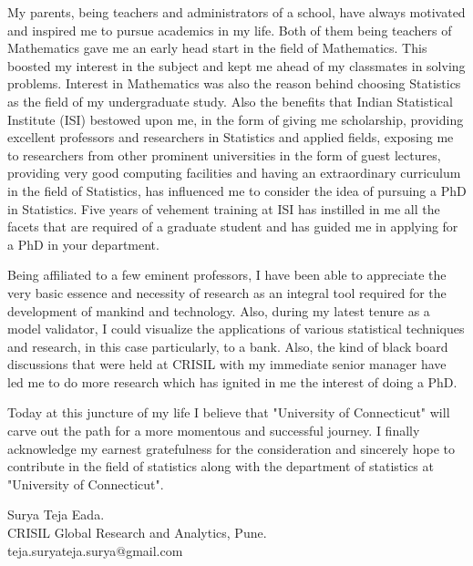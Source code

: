 \documentclass[10pt]{article}
\begin{document}
My parents, being teachers and administrators of a school, have always motivated and inspired me to pursue academics in my life. Both of them being teachers of Mathematics gave me an early head start in the field of Mathematics. This boosted my interest in the subject and kept me ahead of my classmates in solving problems. Interest in Mathematics was also the reason behind choosing Statistics as the field of my undergraduate study. Also the benefits that Indian Statistical Institute (ISI) bestowed upon me, in the form of giving me scholarship, providing excellent professors and researchers in Statistics and applied fields, exposing me to researchers from other prominent universities in the form of guest lectures, providing very good computing facilities and having an extraordinary curriculum in the field of Statistics, has influenced me to consider the idea of pursuing a PhD in Statistics.  Five years of vehement training at ISI has instilled in me all the facets that are required of a graduate student and has guided me in applying for a PhD in your department.

Being affiliated to a few eminent professors, I have been able to appreciate the very basic essence and necessity of research as an integral tool required for the development of mankind and technology. Also, during my latest tenure as a model validator, I could visualize the applications of various statistical techniques and research, in this case particularly, to a bank. Also, the kind of black board discussions that were held at CRISIL with my immediate senior manager have led me to do more research which has ignited in me the interest of doing a PhD.

Today at this juncture of my life I believe that "University of Connecticut" will carve out the path for a more momentous and successful journey. I finally acknowledge my earnest gratefulness for the consideration and sincerely hope to contribute in the field of statistics along with the department of statistics at "University of Connecticut".

 



\begin{flushleft}

Surya Teja Eada.\\
CRISIL Global Research and Analytics, Pune.\\
teja.suryateja.surya@gmail.com

\end{flushleft}
\end{document}
